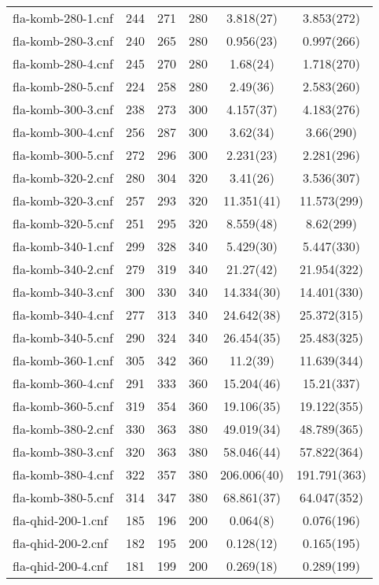\begin{table}
\begin{tabular}{l| c c c c c }
fla-komb-280-1.cnf & 244 & 271 & 280 & 3.818(27) & 3.853(272) \\
fla-komb-280-3.cnf & 240 & 265 & 280 & 0.956(23) & 0.997(266) \\
fla-komb-280-4.cnf & 245 & 270 & 280 & 1.68(24) & 1.718(270) \\
fla-komb-280-5.cnf & 224 & 258 & 280 & 2.49(36) & 2.583(260) \\
fla-komb-300-3.cnf & 238 & 273 & 300 & 4.157(37) & 4.183(276) \\
fla-komb-300-4.cnf & 256 & 287 & 300 & 3.62(34) & 3.66(290) \\
fla-komb-300-5.cnf & 272 & 296 & 300 & 2.231(23) & 2.281(296) \\
fla-komb-320-2.cnf & 280 & 304 & 320 & 3.41(26) & 3.536(307) \\
fla-komb-320-3.cnf & 257 & 293 & 320 & 11.351(41) & 11.573(299) \\
fla-komb-320-5.cnf & 251 & 295 & 320 & 8.559(48) & 8.62(299) \\
fla-komb-340-1.cnf & 299 & 328 & 340 & 5.429(30) & 5.447(330) \\
fla-komb-340-2.cnf & 279 & 319 & 340 & 21.27(42) & 21.954(322) \\
fla-komb-340-3.cnf & 300 & 330 & 340 & 14.334(30) & 14.401(330) \\
fla-komb-340-4.cnf & 277 & 313 & 340 & 24.642(38) & 25.372(315) \\
fla-komb-340-5.cnf & 290 & 324 & 340 & 26.454(35) & 25.483(325) \\
fla-komb-360-1.cnf & 305 & 342 & 360 & 11.2(39) & 11.639(344) \\
fla-komb-360-4.cnf & 291 & 333 & 360 & 15.204(46) & 15.21(337) \\
fla-komb-360-5.cnf & 319 & 354 & 360 & 19.106(35) & 19.122(355) \\
fla-komb-380-2.cnf & 330 & 363 & 380 & 49.019(34) & 48.789(365) \\
fla-komb-380-3.cnf & 320 & 363 & 380 & 58.046(44) & 57.822(364) \\
fla-komb-380-4.cnf & 322 & 357 & 380 & 206.006(40) & 191.791(363) \\
fla-komb-380-5.cnf & 314 & 347 & 380 & 68.861(37) & 64.047(352) \\
fla-qhid-200-1.cnf & 185 & 196 & 200 & 0.064(8) & 0.076(196) \\
fla-qhid-200-2.cnf & 182 & 195 & 200 & 0.128(12) & 0.165(195) \\
fla-qhid-200-4.cnf & 181 & 199 & 200 & 0.269(18) & 0.289(199) \\

\end{tabular}
\end{table}
